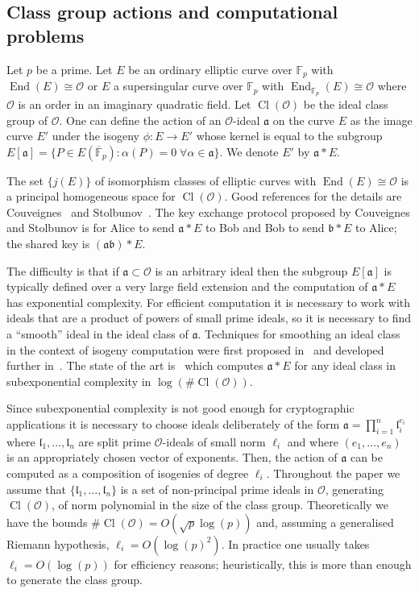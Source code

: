 \documentclass{llncs}
\newcommand{\F}{\mathbb{F}}
\newcommand{\Fpbar}{\overline{\mathbb{F}}_p}
\newcommand{\OO}{\mathcal{O}}
\DeclareMathOperator{\End}{End}
\DeclareMathOperator{\Cl}{Cl}
\renewcommand{\a}{\mathfrak{a}}
\renewcommand{\b}{\mathfrak{b}}
\renewcommand{\l}{\mathfrak{l}}
\begin{document}
 

\subsection{Class group actions and computational problems}

Let $p$ be a prime.
Let $E$ be an ordinary elliptic curve over $\F_p$ with $\End(E) \cong \OO$ or $E$ a supersingular curve over $\F_p$ with $\End_{\F_p}(E) \cong \OO$ where $\OO$ is an order in an imaginary quadratic field.
Let $\Cl(\OO )$ be the ideal class group of $\OO$.
One can define the action of an $\OO$-ideal $\a$ on the curve $E$ as the image curve $E'$ under the isogeny $\phi : E \to E'$ whose kernel is equal to the subgroup $E[ \a ] = \{ P \in E( \Fpbar ) : \alpha(P) = 0 \; \forall \alpha \in \a \}$.
We denote $E'$ by $\a * E$.

The set $\{ j(E) \}$ of isomorphism classes of elliptic curves with $\End(E) \cong \OO$ is a principal homogeneous space for $\Cl(\OO )$.
Good references for the details are Couveignes~\cite{Couv06} and Stolbunov~\cite{Sto12}.
The key exchange protocol proposed by Couveignes and Stolbunov is for Alice to send $\a * E$ to Bob and Bob to send $\b * E$ to Alice; the shared key is $(\a\b) * E$.


The difficulty is that if $\a\subset\OO$ is an arbitrary ideal then the subgroup $E[ \a ]$ is typically defined over a very large field extension and the computation of $\a*E$ has exponential complexity.
For efficient computation it is necessary to work with ideals that are a product of powers of small prime ideals, so it is necessary to find a ``smooth'' ideal in the ideal class of $\a$.
Techniques for smoothing an ideal class in the context of isogeny computation were first proposed in~\cite{GHS02} and developed further in~\cite{BCL08,JS10,biasse_fieker_jacobson_2016}.
The state of the art is~\cite{biasse_fieker_jacobson_2016} which computes $\a * E$ for any ideal class in subexponential complexity in $\log(\#\Cl(\OO))$.

Since subexponential complexity is not good enough for cryptographic applications it is necessary to choose ideals deliberately of the form $\a = \prod_{i=1}^n \l_i^{e_i}$ where $\l_1, \dots, \l_n$ are split prime $\OO$-ideals of small norm $\ell_i$ and where $(e_1, \dots, e_n)$ is an appropriately chosen vector of exponents.
Then, the action of $\a$ can be computed as a composition of isogenies of degree $\ell_i$.
Throughout the paper we assume that $\{ \l_1, \dots, \l_n \}$ is a set of non-principal prime ideals in $\OO$, generating $\Cl(\OO)$, of norm polynomial in the size of the class group.
Theoretically we have the bounds $\#\Cl(\OO) = O( \sqrt{p} \log(p) )$ and, assuming a generalised Riemann hypothesis, $\ell_i = O( \log(p)^2 )$.
In practice one usually takes $\ell_i=O(\log(p))$ for efficiency reasons; heuristically, this is more than enough to generate the class group.
\end{document}
